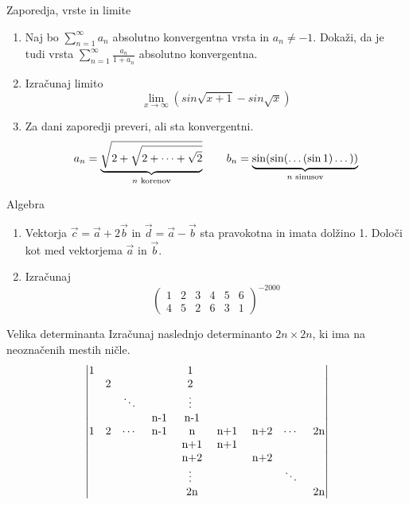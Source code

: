 \begin{frame}{Zaporedja, vrste in limite}
	\begin{enumerate}
		\item 
		Naj bo $ \sum_{n=1}^{\infty} a_n$ absolutno konvergentna vrsta in $a_n \ne -1$.
		Dokaži, da je tudi vrsta $\sum_{n=1}^\infty \frac{a_n}{1+a_n}$
		absolutno konvergentna.

		\item
		Izračunaj limito
		\[
			\lim_{x\to\infty} (sin\sqrt{x + 1} - sin\sqrt{x})
		\]

		\item
		Za dani zaporedji preveri, ali sta konvergentni.
		\[
			a_n = \underbrace{\sqrt{2+\sqrt{2+\dots+\sqrt{2}}}}_\text{$ n$ korenov} \qquad
			b_n = \underbrace{\sin(\sin(\dots(\sin 1)\dots))}_\text{$ n$ sinusov}
		\]

	\end{enumerate}
\end{frame}

\begin{frame}{Algebra}
	\begin{enumerate}
		\item
		Vektorja $ \vec{c} = \vec{a} + 2\vec{b}$ in $ \vec{d} = \vec{a} - \vec{b}$
		sta pravokotna in imata dolžino 1. Določi kot med vektorjema $\vec{a}$ in $\vec{b}$.
		\item 
		Izračunaj
		\[
		\begin{pmatrix}
			1 & 2 & 3 & 4 & 5 & 6 \\
			4 & 5 & 2 & 6 & 3 & 1
		\end{pmatrix}^{-2000}
		\]
	\end{enumerate}
\end{frame}

\begin{frame}{Velika determinanta}
	Izračunaj naslednjo determinanto $2n \times 2n$, ki ima na neoznačenih mestih ničle.
	\[
		\begin{vmatrix}
			1 &  &  &  & 1 &  &  &  &  \\
			  & 2 &  &  & 2 &  &  &  &  \\
			  &  & \ddots &  & \vdots &  &  &  &  \\
			  &  &  & $ n-1$ & $ n-1$ &  &  &  &  \\
			1 & 2 & \cdots & $ n-1$ & $ n$ & $ n+1$ & $ n+2$ & \cdots & $ 2n$ \\
			  &  &  &  & $ n+1$ & $ n+1$ &  &  &  \\
			  &  &  &  & $ n+2$ &  & $ n+2$ &  &  \\
			  &  &  &  & \vdots &  &  & \ddots &  \\
			  &  &  &  & $ 2n$ &  &  &  & $ 2n$ 
		\end{vmatrix}
	\]
\end{frame}

